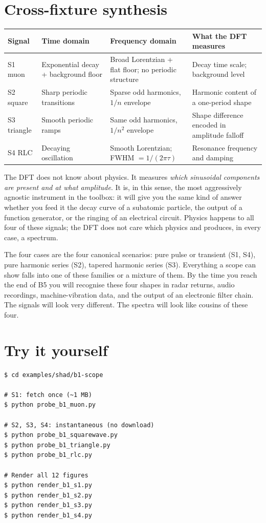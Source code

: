\documentclass[11pt,a4paper,openany]{book}
\begin{document}
\section{Cross-fixture synthesis}

\begin{longtable}{p{1.5cm}p{3.5cm}p{4.0cm}p{4.5cm}}
\toprule
\textbf{Signal} & \textbf{Time domain} & \textbf{Frequency domain} & \textbf{What the DFT measures} \\
\midrule
\endhead
S1 muon & Exponential decay + background floor & Broad Lorentzian + flat floor; no periodic structure & Decay time scale; background level \\
S2 square & Sharp periodic transitions & Sparse odd harmonics, $1/n$ envelope & Harmonic content of a one-period shape \\
S3 triangle & Smooth periodic ramps & Same odd harmonics, $1/n^2$ envelope & Shape difference encoded in amplitude falloff \\
S4 RLC & Decaying oscillation & Smooth Lorentzian; FWHM $= 1/(2\pi\tau)$ & Resonance frequency and damping \\
\bottomrule
\end{longtable}

The DFT does not know about physics. It measures \emph{which
sinusoidal components are present and at what amplitude}. It is, in
this sense, the most aggressively agnostic instrument in the
toolbox: it will give you the same kind of answer whether you feed
it the decay curve of a subatomic particle, the output of a function
generator, or the ringing of an electrical circuit. Physics happens
to all four of these signals; the DFT does not care which physics
and produces, in every case, a spectrum.

The four cases are the four canonical scenarios: pure pulse or
transient (S1, S4), pure harmonic series (S2), tapered harmonic
series (S3). Everything a scope can show falls into one of these
families or a mixture of them. By the time you reach the end of B5
you will recognise these four shapes in radar returns, audio
recordings, machine-vibration data, and the output of an electronic
filter chain. The signals will look very different. The spectra will
look like cousins of these four.

\section{Try it yourself}

\begin{lstlisting}[style=shaddata]
$ cd examples/shad/b1-scope

# S1: fetch once (~1 MB)
$ python probe_b1_muon.py

# S2, S3, S4: instantaneous (no download)
$ python probe_b1_squarewave.py
$ python probe_b1_triangle.py
$ python probe_b1_rlc.py

# Render all 12 figures
$ python render_b1_s1.py
$ python render_b1_s2.py
$ python render_b1_s3.py
$ python render_b1_s4.py
\end{lstlisting}
\end{document}
